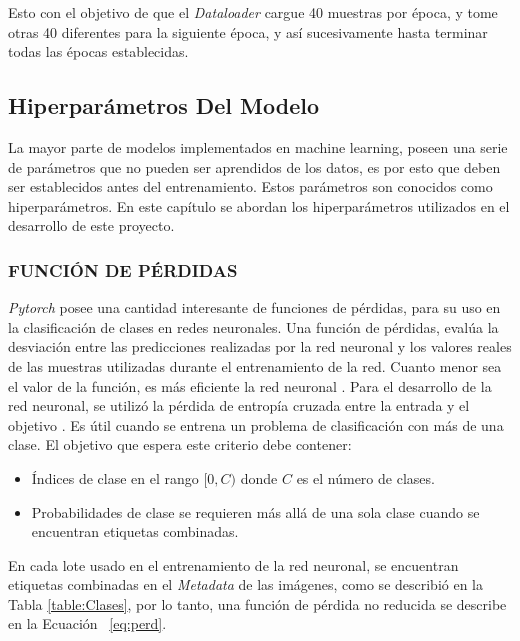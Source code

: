 		Esto con el objetivo de que el \textit{Dataloader} cargue 40 muestras por época, y tome otras 40 diferentes para la siguiente época, y así sucesivamente hasta terminar todas las épocas establecidas.  
		
		
		
			
		
		\subsection{Hiperparámetros Del Modelo}
		
		La mayor parte de modelos implementados en machine learning, poseen una serie de parámetros que no pueden ser aprendidos de los datos, es por esto que deben ser establecidos antes del entrenamiento. Estos parámetros son conocidos como hiperparámetros. En este capítulo se abordan los hiperparámetros utilizados en el desarrollo de este proyecto.
		
			\subsubsection{FUNCIÓN DE PÉRDIDAS}		
			
			\textit{Pytorch} posee una cantidad interesante de funciones de pérdidas, para su uso en la clasificación de clases en redes neuronales. Una función de pérdidas, evalúa la desviación entre las predicciones realizadas por la red neuronal y los valores reales de las muestras utilizadas durante el entrenamiento de la red. Cuanto menor sea el valor de la función, es más eficiente la red neuronal \cite{mathivet2018inteligencia}. 	
			Para el desarrollo de la red neuronal, se utilizó la pérdida de entropía cruzada entre la entrada y el objetivo \cite{Pytorch}. Es útil cuando se entrena un problema de clasificación con más de una clase.  El objetivo que espera este criterio debe contener:
			
			\begin{itemize}
				\item Índices de clase en el rango $[0,C)$ donde $C$ es el número de clases.
				\item Probabilidades de clase se requieren más allá de una sola clase cuando se encuentran etiquetas combinadas.				 
			\end{itemize}
			
			En cada lote usado en el entrenamiento de la red neuronal, se encuentran etiquetas combinadas en el \textit{Metadata} de las imágenes, como se describió en la Tabla \ref{table:Clases}, por lo tanto, una función de pérdida no reducida \cite{Pytorch} se describe en la Ecuación ~\ref{eq:perd}.\\
			
